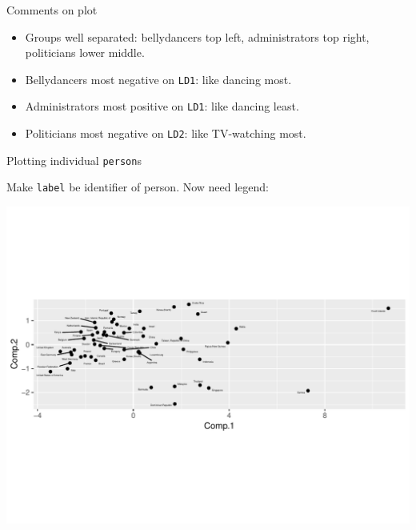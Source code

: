 \begin{frame}[fragile]{Comments on plot}
  
  \begin{itemize}
  \item Groups well separated: bellydancers top left, administrators
    top right, politicians lower middle.
  \item Bellydancers most negative on \texttt{LD1}: like dancing most.
  \item Administrators most positive on \texttt{LD1}: like dancing least.
  \item Politicians most negative on \texttt{LD2}: like TV-watching most.
  \end{itemize}
  
\end{frame}

\begin{frame}[fragile]{Plotting individual \texttt{person}s}
  
Make \texttt{label} be identifier of person. Now need legend:

\begin{knitrout}
\color{fgcolor}\begin{kframe}
\begin{alltt}
\hlstd{(}
    \hlopt{+}\hlstd{()}\hlopt{+}
    \hlstd{()}
\end{alltt}
\end{kframe}
\includegraphics[width=\maxwidth]{figure/unnamed-chunk-21-1} 

\end{knitrout}
  
  
\end{frame}

